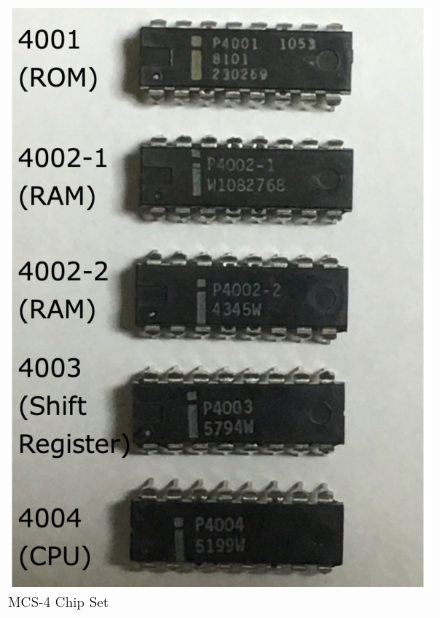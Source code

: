 \begin{figure}
\begin{minipage}{0.35\linewidth}
    \includegraphics[width=1.0\columnwidth]{./Figure/Outline_MCS4Chipset.png}
    \caption{MCS-4 Chip Set\protect\footnotemark[2]}
    \label{fig:MCS4CHIPSET}
    \end{minipage}
\end{figure}

